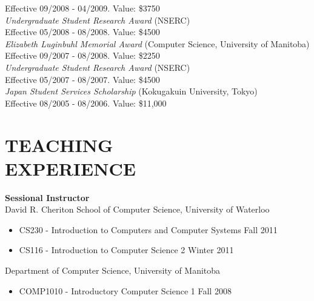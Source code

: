 \documentclass[line,margin]{res}
\begin{document}
\begin{resume}
  \hspace*{1cm} Effective 09/2008 - 04/2009. Value: \$3750 \vspace{3pt} \\
  {\sl Undergraduate Student Research Award} (NSERC) \\
  \hspace*{1cm} Effective 05/2008 - 08/2008. Value: \$4500 \vspace{3pt} \\
  {\sl Elizabeth Luginbuhl Memorial Award} (Computer Science, University of Manitoba) \\
  \hspace*{1cm} Effective 09/2007 - 08/2008. Value: \$2250 \vspace{3pt} \\
  {\sl Undergraduate Student Research Award} (NSERC) \\
  \hspace*{1cm} Effective 05/2007 - 08/2007. Value: \$4500 \vspace{3pt} \\
  {\sl Japan Student Services Scholarship} (Kokugakuin University, Tokyo) \\
  \hspace*{1cm} Effective 08/2005 - 08/2006. Value: \$11,000

\clearpage

\section{TEACHING \\EXPERIENCE}
  {\bf Sessional Instructor} \vspace{4pt} \\
  David R. Cheriton School of Computer Science, University of Waterloo
  \begin{itemize}  \itemsep -2pt %
    \item CS230 - Introduction to Computers and Computer Systems \hfill Fall 2011
    \item CS116 - Introduction to Computer Science 2 \hfill Winter 2011
  \end{itemize} \vspace{-8pt}
  Department of Computer Science, University of Manitoba
  \begin{itemize}  \itemsep -2pt %
    \item COMP1010 - Introductory Computer Science 1 \hfill Fall 2008
  \end{itemize}
  

\end{resume}
\end{document}
